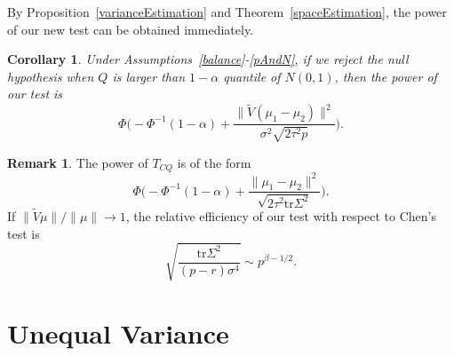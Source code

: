 \documentclass[review]{elsarticle}
\theoremstyle{plain}
\newtheorem{corollary}{\quad\quad Corollary}
\theoremstyle{definition}
\newtheorem{remark}{\quad\quad Remark}
\theoremstyle{remark}
\begin{document}

By Proposition~\ref{varianceEstimation}  and Theorem~\ref{spaceEstimation}, the power of our new test can be obtained immediately.


\begin{corollary}\label{testPowerh}
    Under Assumptions~\ref{balance}-\ref{pAndN},
    if we reject the null hypothesis when $Q$ is larger than $1-\alpha$ quantile of $N(0,1)$, then the power of our test is
    \begin{equation*}
        \Phi\Big(-\Phi^{-1}(1-\alpha)+\frac{\|\tilde{V}(\mu_1-\mu_2)\|^2}{\sigma^2\sqrt{2\tau^2p}}\Big).
    \end{equation*}
\end{corollary}


\begin{remark} The power of $T_{CQ}$ is of the form
\begin{equation*}
    \Phi\Big(-\Phi^{-1}(1-\alpha)+\frac{\|\mu_1-\mu_2\|^2}{\sqrt{2\tau^2\mathrm{tr}\Sigma^2}}\Big).
\end{equation*}
If $\|\tilde{V}\mu\|/\|\mu\|\to 1$, the relative efficiency of our test with respect to Chen's test is
\begin{equation*}
    \sqrt{\frac{\mathrm{tr}\Sigma^2}{(p-r)\sigma^4}}\sim p^{\beta-1/2}.
\end{equation*}
\end{remark}

\section{Unequal Variance}
\end{document}
